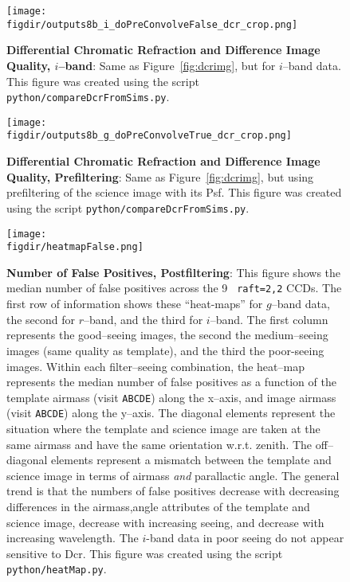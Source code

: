 \documentclass[prd, nofootinbib, floatfix, 11pt, tightenlines, times]{article}
\def\figdir{../figures}
\def\A{{\tt A}}
\def\B{{\tt B}}
\def\C{{\tt C}}
\def\D{{\tt D}}
\def\E{{\tt E}}
\begin{document}
\begin{figure}[h!]
  \centering
  \texttt{[image: \\figdir/outputs8b\_i\_doPreConvolveFalse\_dcr\_crop.png]}
  \caption{{\bf Differential Chromatic Refraction and Difference Image
      Quality, $i$--band}: Same as Figure~\ref{fig:dcrimg}, but for
    $i$--band data.  This figure was created using the script {\tt
      python/compareDcrFromSims.py}.}
  \label{fig:dcrimi}
\end{figure}

\begin{figure}[h!]
  \centering
  \texttt{[image: \\figdir/outputs8b\_g\_doPreConvolveTrue\_dcr\_crop.png]}
  \caption{{\bf Differential Chromatic Refraction and Difference Image
      Quality, Prefiltering}: Same as Figure~\ref{fig:dcrimg}, but
    using prefiltering of the science image with its Psf.  This figure
    was created using the script {\tt python/compareDcrFromSims.py}.}
  \label{fig:dcrimgpre}
\end{figure}

\begin{figure}[h!]
  \centering
  \texttt{[image: \\figdir/heatmapFalse.png]}
  \caption{{\bf Number of False Positives, Postfiltering}: This figure
    shows the median number of false positives across the 9 {\tt
      raft=2,2} CCDs.  The first row of information shows these
    ``heat-maps'' for $g$--band data, the second for $r$--band, and
    the third for $i$--band.  The first column represents the
    good--seeing images, the second the medium--seeing images (same
    quality as template), and the third the poor-seeing images.
    Within each filter--seeing combination, the heat--map represents
    the median number of false positives as a function of the template
    airmass (visit \A\B\C\D\E) along the x--axis, and image airmass
    (visit \A\B\C\D\E) along the y--axis.  The diagonal elements
    represent the situation where the template and science image are
    taken at the same airmass and have the same orientation
    w.r.t. zenith.  The off--diagonal elements represent a mismatch
    between the template and science image in terms of airmass {\it
      and} parallactic angle.  The general trend is that the numbers
    of false positives decrease with decreasing differences in the
    airmass,angle attributes of the template and science image,
    decrease with increasing seeing, and decrease with increasing
    wavelength.  The $i$-band data in poor seeing do not appear
    sensitive to Dcr.  This figure was created using the script {\tt
      python/heatMap.py}.}
  \label{fig:heatpost}
\end{figure}
\end{document}
